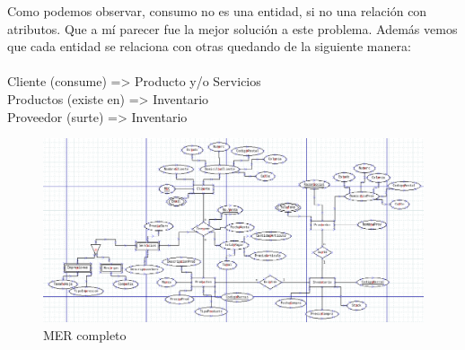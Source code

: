 \documentclass[letter,12pt]{article}
\begin{document}
Como podemos observar, consumo no es una entidad, si no una relación con atributos. Que a mí parecer fue la mejor solución a este problema. Además vemos que cada entidad se relaciona con otras quedando de la siguiente manera:\\ \\
Cliente (consume) => Producto y/o Servicios\\
Productos (existe en) => Inventario\\
Proveedor (surte) => Inventario\\
\begin{center}
\begin{figure}[H]
\includegraphics[scale=.45]{MER.png}
\caption{MER completo}
\end{figure}
\end{center}
\newpage
\end{document}
